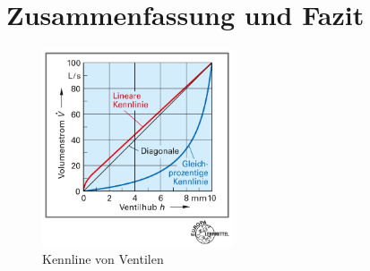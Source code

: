 \section{Zusammenfassung und Fazit}
\label{sec:zusammenfassung}


\begin{figure}[h!]
	\centering
	\includegraphics[width=0.5\textwidth]{img/035-3}
	\caption{Kennline von Ventilen \cite[S.35, Bild 3]{Ignatowitz.2013}}
	\label{fig:kennlinie_ct}
\end{figure}
\FloatBarrier
